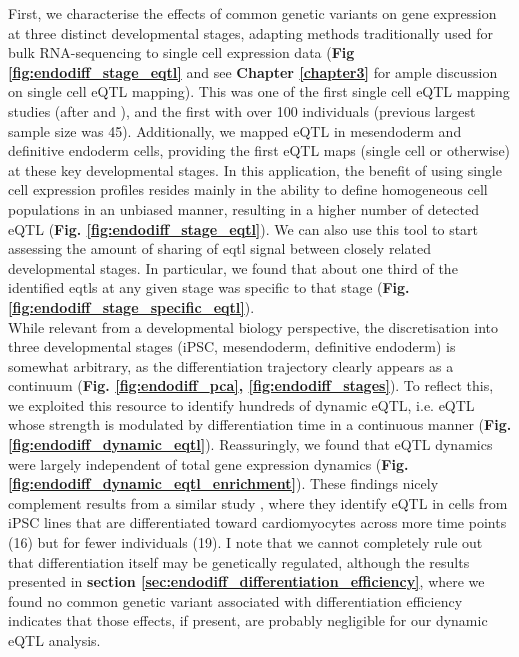 First, we characterise the effects of common genetic variants on gene expression at three distinct developmental stages, adapting methods traditionally used for bulk RNA-sequencing to single cell expression data (\textbf{Fig \ref{fig:endodiff_stage_eqtl}} and see \textbf{Chapter \ref{chapter3}} for ample discussion on single cell eQTL mapping).
This was one of the first single cell eQTL mapping studies (after \cite{wills2013single} and \cite{van2018single}), and the first with over 100 individuals (previous largest sample size was 45).
Additionally, we mapped eQTL in mesendoderm and definitive endoderm cells, providing the first eQTL maps (single cell or otherwise) at these key developmental stages. 
In this application, the benefit of using single cell expression profiles resides mainly in the ability to define homogeneous cell populations in an unbiased manner, resulting in a higher number of detected eQTL (\textbf{Fig. \ref{fig:endodiff_stage_eqtl}}).
We can also use this tool to start assessing the amount of sharing of \gls{eqtl} signal between closely related developmental stages.
In particular, we found that about one third of the identified \glspl{eqtl} at any given stage was specific to that stage (\textbf{Fig. \ref{fig:endodiff_stage_specific_eqtl}}).\\

While relevant from a developmental biology perspective, the discretisation into three developmental stages (iPSC, mesendoderm, definitive endoderm) is somewhat arbitrary, as the differentiation trajectory clearly appears as a continuum (\textbf{Fig. \ref{fig:endodiff_pca}, \ref{fig:endodiff_stages}}).
To reflect this, we exploited this resource to identify hundreds of dynamic eQTL, i.e. eQTL whose strength is modulated by differentiation time in a continuous manner (\textbf{Fig. \ref{fig:endodiff_dynamic_eqtl}}).
Reassuringly, we found that eQTL dynamics were largely independent of total gene expression dynamics (\textbf{Fig. \ref{fig:endodiff_dynamic_eqtl_enrichment}}).
These findings nicely complement results from a similar study \cite{strober2019dynamic}, where they identify eQTL in cells from iPSC lines that are differentiated toward cardiomyocytes across more time points (16) but for fewer individuals (19).
I note that we cannot completely rule out that differentiation itself may be genetically regulated, although the results presented in \textbf{section \ref{sec:endodiff_differentiation_efficiency}}, where we found no common genetic variant associated with differentiation efficiency indicates that those effects, if present, are probably negligible for our dynamic eQTL analysis. \\

